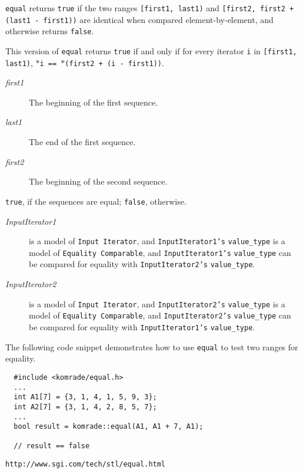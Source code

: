 {\tt equal} returns {\tt true} if the two ranges {\tt [first1, last1)} and {\tt [first2, first2 + (last1 - first1))} are identical when compared element-by-element, and otherwise returns {\tt false}.

This version of {\tt equal} returns {\tt true} if and only if for every iterator {\tt i} in {\tt [first1, last1)}, {\tt $\ast$i == $\ast$(first2 + (i - first1))}.

\begin{Desc}
\item[Parameters:]
\begin{description}
\item[{\em first1}]The beginning of the first sequence. \item[{\em last1}]The end of the first sequence. \item[{\em first2}]The beginning of the second sequence. \end{description}
\end{Desc}
\begin{Desc}
\item[Returns:]{\tt true}, if the sequences are equal; {\tt false}, otherwise.\end{Desc}
\begin{Desc}
\item[Template Parameters:]
\begin{description}
\item[{\em InputIterator1}]is a model of {\tt Input Iterator}, and {\tt InputIterator1's} {\tt value\_\-type} is a model of {\tt Equality Comparable}, and {\tt InputIterator1's} {\tt value\_\-type} can be compared for equality with {\tt InputIterator2's} {\tt value\_\-type}. \item[{\em InputIterator2}]is a model of {\tt Input Iterator}, and {\tt InputIterator2's} {\tt value\_\-type} is a model of {\tt Equality Comparable}, and {\tt InputIterator2's} {\tt value\_\-type} can be compared for equality with {\tt InputIterator1's} {\tt value\_\-type}.\end{description}
\end{Desc}
The following code snippet demonstrates how to use {\tt equal} to test two ranges for equality.



\begin{Code}\begin{verbatim}  #include <komrade/equal.h>
  ...
  int A1[7] = {3, 1, 4, 1, 5, 9, 3};
  int A2[7] = {3, 1, 4, 2, 8, 5, 7};
  ...
  bool result = komrade::equal(A1, A1 + 7, A1);

  // result == false
\end{verbatim}
\end{Code}



\begin{Desc}
\item[See also:]{\tt http://www.sgi.com/tech/stl/equal.html} \end{Desc}
